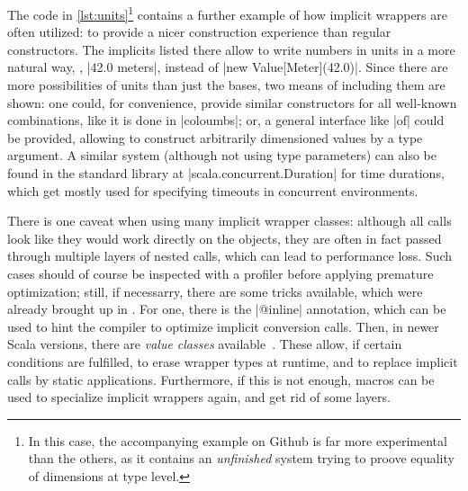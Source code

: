 The code in \autoref{lst:units}\footnote{In this case, the accompanying example on Github is far
  more experimental than the others, as it contains an \emph{unfinished} system trying to proove
  equality of dimensions at type level.} contains a further example of how implicit wrappers are
often utilized: to provide a nicer construction experience than regular constructors. The implicits
listed there allow to write numbers in  units in a more natural way, \eg, |42.0 meters|,
instead of |new Value[Meter](42.0)|. Since there are more possibilities of units than just the
bases, two means of including them are shown: one could, for convenience, provide similar
constructors for all well-known combinations, like it is done in |coloumbs|; or, a general interface
like |of| could be provided, allowing to construct arbitrarily dimensioned values by a type
argument. A similar system (although not using type parameters) can also be found in the standard
library at |scala.concurrent.Duration| for time durations, which get mostly used for specifying
timeouts in concurrent environments.

There is one caveat when using many implicit wrapper classes: although all calls look like they
would work directly on the objects, they are often in fact passed through multiple layers of nested
calls, which can lead to performance loss. Such cases should of course be inspected with a profiler
before applying premature optimization; still, if necessarry, there are some tricks available, which
were already brought up in . For one, there is the |@inline| annotation,
which can be used to hint the compiler to optimize implicit conversion calls. Then, in newer Scala
versions, there are \emph{value classes} available~\cite{odersky2012:value_classes}. These allow, if
certain conditions are fulfilled, to erase wrapper types at runtime, and to replace implicit calls
by static applications. Furthermore, if this is not enough, macros can be used to specialize
implicit wrappers again, and get rid of some layers.




